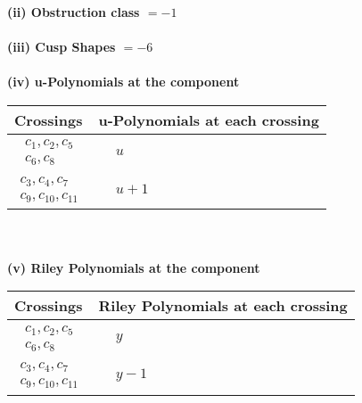 \documentclass[1p]{elsarticle_modified}
\theoremstyle{definition}
\begin{document}
\flushleft \textbf{(ii) Obstruction class $= -1$}\\~\\
\flushleft \textbf{(iii) Cusp Shapes $= -6$}\\~\\
\newpage\renewcommand{\arraystretch}{1}
\flushleft \textbf{(iv) u-Polynomials at the component}\newline \\
\begin{tabular}{m{50pt}|m{274pt}}
Crossings & \hspace{64pt}u-Polynomials at each crossing \\
\hline $$\begin{aligned}c_{1},c_{2},c_{5}\\c_{6},c_{8}\end{aligned}$$&$\begin{aligned}
&u
\end{aligned}$\\
\hline $$\begin{aligned}c_{3},c_{4},c_{7}\\c_{9},c_{10},c_{11}\end{aligned}$$&$\begin{aligned}
&u+1
\end{aligned}$\\
\hline
\end{tabular}\\~\\
\newpage\renewcommand{\arraystretch}{1}
\flushleft \textbf{(v) Riley Polynomials at the component}\newline \\
\begin{tabular}{m{50pt}|m{274pt}}
Crossings & \hspace{64pt}Riley Polynomials at each crossing \\
\hline $$\begin{aligned}c_{1},c_{2},c_{5}\\c_{6},c_{8}\end{aligned}$$&$\begin{aligned}
&y
\end{aligned}$\\
\hline $$\begin{aligned}c_{3},c_{4},c_{7}\\c_{9},c_{10},c_{11}\end{aligned}$$&$\begin{aligned}
&y-1
\end{aligned}$\\
\hline
\end{tabular}\\~\\
\end{document}
